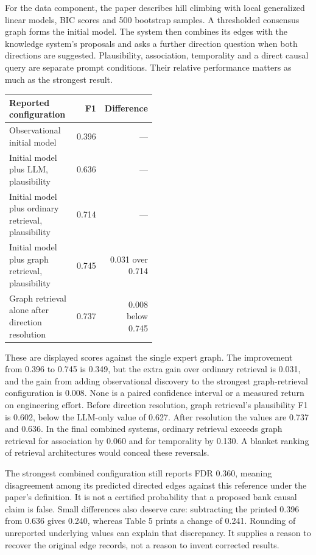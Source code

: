 For the data component, the paper describes hill climbing with local generalized
linear models, BIC scores and 500 bootstrap samples. A thresholded consensus graph
forms the initial model. The system then combines its edges with the knowledge
system's proposals and asks a further direction question when both directions
are suggested. Plausibility, association, temporality and a direct causal query
are separate prompt conditions. Their relative performance matters as much as
the strongest result. \citep{exec22_domain_lin}

\begin{center}
\begin{tabular}{p{0.48\linewidth}rr}
\hline
Reported configuration & F1 & Difference \\
\hline
Observational initial model & 0.396 & --- \\
Initial model plus LLM, plausibility & 0.636 & --- \\
Initial model plus ordinary retrieval, plausibility & 0.714 & --- \\
Initial model plus graph retrieval, plausibility & 0.745 & 0.031 over 0.714 \\
Graph retrieval alone after direction resolution & 0.737 & 0.008 below 0.745 \\
\hline
\end{tabular}
\end{center}

These are displayed scores against the single expert graph. The improvement
from 0.396 to 0.745 is 0.349, but the extra gain over ordinary retrieval is 0.031,
and the gain from adding observational discovery to the strongest graph-retrieval
configuration is 0.008. None is a paired confidence interval or a measured return
on engineering effort. Before direction resolution, graph retrieval's plausibility
F1 is 0.602, below the LLM-only value of 0.627. After resolution the values are
0.737 and 0.636. In the final combined systems, ordinary retrieval exceeds graph
retrieval for association by 0.060 and for temporality by 0.130. A blanket ranking
of retrieval architectures would conceal these reversals. \citep{exec22_domain_lin,exec22_domain_reference}

The strongest combined configuration still reports FDR 0.360, meaning disagreement
among its predicted directed edges against this reference under the paper's
definition. It is not a certified probability that a proposed bank causal claim
is false. Small differences also deserve care: subtracting the printed 0.396
from 0.636 gives 0.240, whereas Table 5 prints a change of 0.241. Rounding of
unreported underlying values can explain that discrepancy. It supplies a reason
to recover the original edge records, not a reason to invent corrected results.

